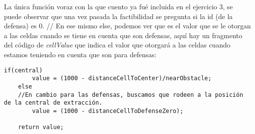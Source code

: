 La única función voraz con la que cuento ya fué incluida en el ejercicio 3, 
se puede observar que una vez pasada la factibilidad se pregunta si la id (de la defensa) es 0.
//
En ese mismo else, podemos ver que es el valor que se le otorgan a las celdas cuando se tiene en cuenta que son 
defensas, aquí hay un fragmento del código de \textit{cellValue} que indica el valor que otorgará a las celdas 
cuando estamos teniendo en cuenta que son para defensas:
\begin{lstlisting}
if(central)
        value = (1000 - distanceCellToCenter)/nearObstacle;
    else
    //En cambio para las defensas, buscamos que rodeen a la posición de la central de extracción.
        value = (1000 - distanceCellToDefenseZero);
    
    return value;
\end{lstlisting}